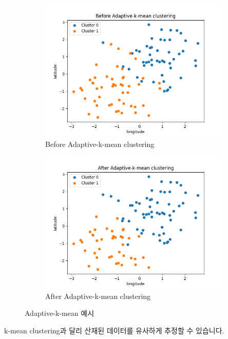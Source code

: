 \documentclass{oblivoir}
\begin{document}
  \begin{figure}[H]
    \begin{subfigure}[b]{.5\textwidth}
      \centering
      \caption{Before Adaptive-k-mean clustering}
      \includegraphics[width=\textwidth]{GPS_clustering_6.png}      
    \end{subfigure}%
    \begin{subfigure}[b]{.5\textwidth}
      \centering
      \caption{After Adaptive-k-mean clustering}
      \includegraphics[width=\textwidth]{GPS_clustering_7.png}
    \end{subfigure}
    \caption{Adaptive-k-mean 예시}
  \end{figure}
  k-mean clustering과 달리 산재된 데이터를 유사하게 추정할 수 있습니다.
\end{document}
